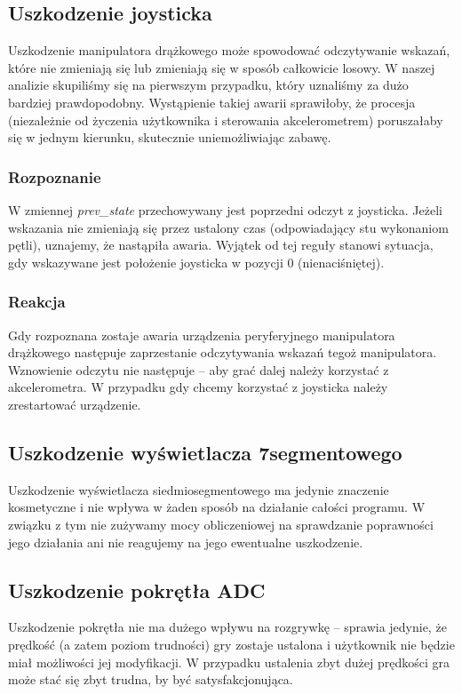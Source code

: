 \documentclass[a4paper,12pt,twoside]{article}
\theoremstyle{plain}
\theoremstyle{definition}
\theoremstyle{remark}
\begin{document}
	\subsection{Uszkodzenie joysticka}
	Uszkodzenie manipulatora drążkowego może spowodować odczytywanie wskazań, które nie zmieniają się lub zmieniają się w sposób całkowicie losowy. W naszej analizie skupiliśmy się na pierwszym przypadku, który uznaliśmy za dużo bardziej prawdopodobny. Wystąpienie takiej awarii sprawiłoby, że procesja (niezależnie od życzenia użytkownika i sterowania akcelerometrem) poruszałaby się w jednym kierunku, skutecznie uniemożliwiając zabawę.
	\subsubsection{Rozpoznanie}
	W zmiennej \textit{prev\_state} przechowywany jest poprzedni odczyt z joysticka. 
	Jeżeli wskazania nie zmieniają się przez ustalony czas (odpowiadający stu wykonaniom pętli), uznajemy, że nastąpiła awaria. Wyjątek od tej reguły stanowi sytuacja, gdy wskazywane jest położenie joysticka w pozycji $0$ (nienaciśniętej). 
	\subsubsection{Reakcja}
	Gdy rozpoznana zostaje awaria urządzenia peryferyjnego manipulatora drążkowego następuje zaprzestanie odczytywania wskazań tegoż manipulatora. Wznowienie odczytu nie następuje -- aby grać dalej należy korzystać z akcelerometra. W przypadku gdy chcemy korzystać z joysticka należy zrestartować urządzenie.
	
	\subsection{Uszkodzenie wyświetlacza 7segmentowego}
	Uszkodzenie wyświetlacza siedmiosegmentowego ma jedynie znaczenie kosmetyczne i nie wpływa w żaden sposób na działanie całości programu. W związku z tym nie zużywamy mocy obliczeniowej na sprawdzanie poprawności jego działania ani nie reagujemy na jego ewentualne uszkodzenie.
	
	\subsection{Uszkodzenie pokrętła ADC}
	Uszkodzenie pokrętła nie ma dużego wpływu na rozgrywkę -- sprawia jedynie, że prędkość (a zatem poziom trudności) gry zostaje ustalona i użytkownik nie będzie miał możliwości jej modyfikacji. W przypadku ustalenia zbyt dużej prędkości gra może stać się zbyt trudna, by być satysfakcjonująca.
	
\end{document}
